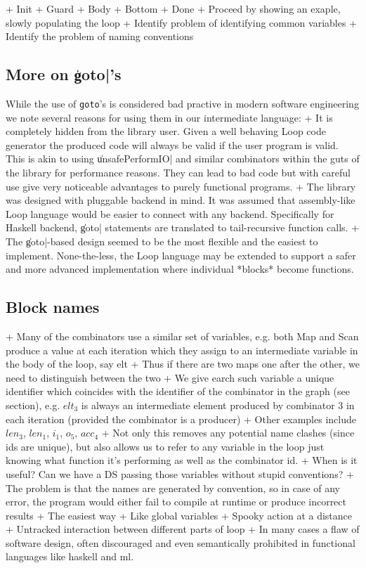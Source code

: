 \documentclass[preamble.tex]{subfiles}
\begin{document}
+ Init
+ Guard
+ Body
+ Bottom
+ Done
+ Proceed by showing an exaple, slowly populating the loop
+ Identify problem of identifying common variables
+ Identify the problem of naming conventions

\subsection{More on \|goto|'s}

While the use of \texttt{goto}'s is considered bad practive in modern software engineering we note several reasons for using them in our intermediate language:
+ It is completely hidden from the library user. Given a well behaving Loop code generator the produced code will always be valid if the user program is valid. This is akin to using \|unsafePerformIO| and similar combinators within the guts of the library for performance reasons. They can lead to bad code but with careful use give very noticeable advantages to purely functional programs.
+ The library was designed with pluggable backend in mind. It was assumed that assembly-like Loop language would be easier to connect with any backend. Specifically for Haskell backend, \|goto| statements are translated to tail-recursive function calls.
+ The \|goto|-based design seemed to be the most flexible and the easiest to implement. None-the-less, the Loop language may be extended to support a safer and more advanced implementation where individual *blocks* become functions.


\subsection{Block names}


+ Many of the combinators use a similar set of variables, e.g. both Map and Scan produce a value at each iteration which they assign to an intermediate variable in the body of the loop, say elt
+ Thus if there are two maps one after the other, we need to distinguish between the two
+ We give earch such variable a unique identifier which coincides with the identifier of the combinator in the graph (see section), e.g. $elt_3$ is always an intermediate element produced by combinator 3 in each iteration (provided the combinator is a producer)
+ Other examples include $len_3$, $len_1$, $i_1$, $o_5$, $acc_4$
+ Not only this removes any potential name clashes (since ids are unique), but also allows us to refer to any variable in the loop just knowing what function it's performing as well as the combinator id.
+ When is it useful? Can we have a DS passing those variables without stupid conventions?
+ The problem is that the names are generated by convention, so in case of any error, the program would either fail to compile at runtime or produce incorrect results
+ The easiest way 
+ Like global variables
+ Spooky action at a distance
+ Untracked interaction between different parts of loop
+ In many cases a flaw of software design, often discouraged and even semantically prohibited in functional languages like haskell and ml.
\end{document}
